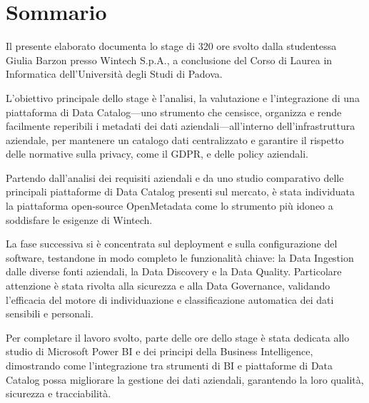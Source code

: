 \cleardoublepage
{}
{}
\begingroup
\let\clearpage\relax
\let\cleardoublepage\relax
\let\cleardoublepage\relax

\chapter*{Sommario}
Il presente elaborato documenta lo stage di 320 ore svolto dalla studentessa Giulia Barzon presso Wintech S.p.A., a conclusione del Corso di Laurea in Informatica dell'Università degli Studi di Padova.

L'obiettivo principale dello stage è l'analisi, la valutazione e l'integrazione di una piattaforma di Data Catalog---uno strumento che censisce, organizza e rende facilmente 
reperibili i metadati dei dati aziendali---all'interno dell'infrastruttura aziendale, per mantenere un catalogo dati centralizzato e garantire il rispetto delle normative sulla privacy, come il GDPR, e delle policy aziendali.

Partendo dall'analisi dei requisiti aziendali e da uno studio comparativo delle principali piattaforme di Data Catalog 
presenti sul mercato, è stata individuata la piattaforma open-source OpenMetadata come lo strumento più idoneo a soddisfare le esigenze di Wintech.

La fase successiva si è concentrata sul deployment e sulla configurazione del software, testandone in modo completo le funzionalità chiave: la Data Ingestion 
dalle diverse fonti aziendali, la Data Discovery e la Data Quality. Particolare attenzione è stata rivolta alla sicurezza e alla Data Governance, validando l'efficacia del motore di individuazione e classificazione automatica dei dati sensibili e personali.

Per completare il lavoro svolto, parte delle ore dello stage è stata dedicata allo studio di Microsoft Power BI e dei principi della Business Intelligence, 
dimostrando come l'integrazione tra strumenti di BI e piattaforme di Data Catalog possa migliorare la gestione dei dati aziendali, garantendo la loro qualità, sicurezza e tracciabilità.




\endgroup

\vfill
